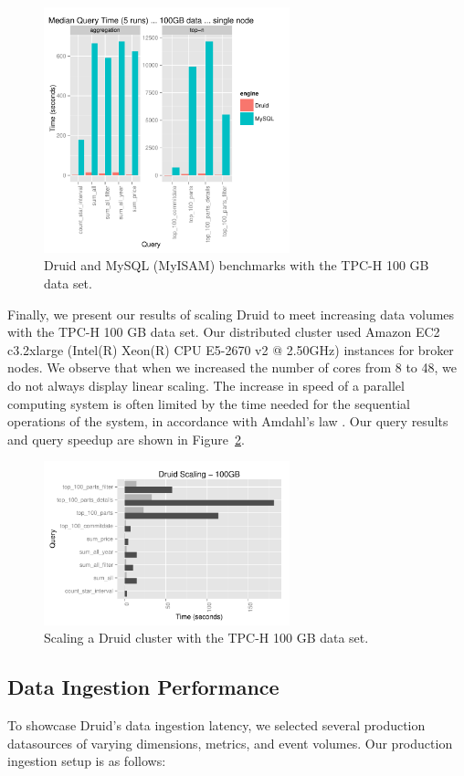 \documentclass{acm_proc_article-sp}
\begin{document}
\begin{figure}
\centering
\includegraphics[width = 2.8in]{tpch_100gb}
\caption{Druid and MySQL (MyISAM) benchmarks with the TPC-H 100 GB data set.}
\label{fig:tpch_100gb}
\end{figure}

Finally, we present our results of scaling Druid to meet increasing data
volumes with the TPC-H 100 GB data set. Our distributed cluster used Amazon EC2
c3.2xlarge (Intel(R) Xeon(R) CPU E5-2670 v2 @ 2.50GHz) instances for broker
nodes. We observe that when we increased the number of cores from 8 to 48, we
do not always display linear scaling.  The increase in speed of a parallel
computing system is often limited by the time needed for the sequential
operations of the system, in accordance with Amdahl's law
\cite{amdahl1967validity}. Our query results and query speedup are shown in
Figure~\ref{fig:tpch_scaling}.

\begin{figure}
\centering
\includegraphics[width = 2.8in]{tpch_scaling}
\caption{Scaling a Druid cluster with the TPC-H 100 GB data set.}
\label{fig:tpch_scaling}
\end{figure}

\subsection{Data Ingestion Performance}
To showcase Druid's data ingestion latency, we selected several production
datasources of varying dimensions, metrics, and event volumes. Our production
ingestion setup is as follows:
\end{document}
